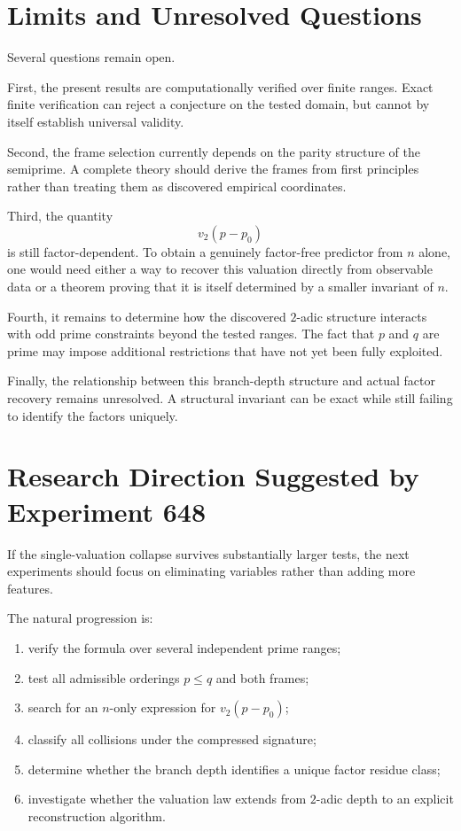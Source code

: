 \documentclass[11pt,a4paper]{article}
\newcommand{\vTwo}{v_2}
\begin{document}
\section{Limits and Unresolved Questions}

Several questions remain open.

First, the present results are computationally verified over finite ranges. Exact finite verification can reject a conjecture on the tested domain, but cannot by itself establish universal validity.

Second, the frame selection currently depends on the parity structure of the semiprime. A complete theory should derive the frames from first principles rather than treating them as discovered empirical coordinates.

Third, the quantity
\[
    \vTwo(p-p_0)
\]
is still factor-dependent. To obtain a genuinely factor-free predictor from $n$ alone, one would need either a way to recover this valuation directly from observable data or a theorem proving that it is itself determined by a smaller invariant of $n$.

Fourth, it remains to determine how the discovered $2$-adic structure interacts with odd prime constraints beyond the tested ranges. The fact that $p$ and $q$ are prime may impose additional restrictions that have not yet been fully exploited.

Finally, the relationship between this branch-depth structure and actual factor recovery remains unresolved. A structural invariant can be exact while still failing to identify the factors uniquely.

\section{Research Direction Suggested by Experiment 648}

If the single-valuation collapse survives substantially larger tests, the next experiments should focus on eliminating variables rather than adding more features.

The natural progression is:

\begin{enumerate}[leftmargin=2em]
    \item verify the formula over several independent prime ranges;
    \item test all admissible orderings $p\le q$ and both frames;
    \item search for an $n$-only expression for $\vTwo(p-p_0)$;
    \item classify all collisions under the compressed signature;
    \item determine whether the branch depth identifies a unique factor residue class;
    \item investigate whether the valuation law extends from $2$-adic depth to an explicit reconstruction algorithm.
\end{enumerate}
\end{document}
